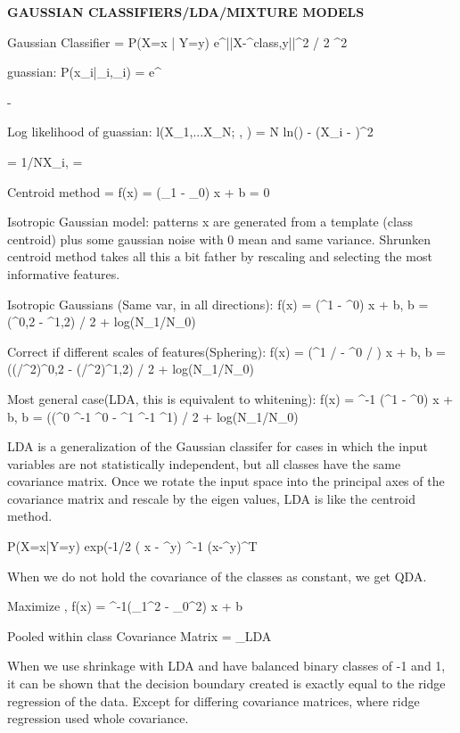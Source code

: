 \documentclass[a4paper,twoside,twocolumn]{article}
\begin{document}
\textbf{GAUSSIAN CLASSIFIERS/LDA/MIXTURE MODELS}

\setlength{\parindent}{0pt}
{\scriptsize

Gaussian Classifier = P(X=x | Y=y) \propto e^{||X-\mu^{class,y}||^2 / 2 \sigma^2}

guassian: P(x_i|\mu_i,\sigma_i) =  e^{- 

Log likelihood of guassian: l(X_1,...X_N; \mu, \sigma) = N ln() - \sum (X_i - \mu)^2

\mu = 1/N\sum X_i, \sigma = 

Centroid method = f(x) = (\mu_1 - \mu_0) \cdot x + b = 0

Isotropic Gaussian model: patterns x are generated from a template (class centroid) plus some gaussian noise with 0 mean and same variance. Shrunken centroid method takes all this a bit father by rescaling and selecting the most informative features.

Isotropic Gaussians (Same var, in all directions): f(x) = (\mu^1 - \mu^0) \cdot x + b, b = (\mu^{0,2} - \mu^{1,2}) / 2 + log(N_1/N_0)

Correct if different scales of features(Sphering): f(x) = (\mu^1 / \sigma - \mu^0 / \sigma) \cdot x + b, b = ((\mu/\sigma^2)^{0,2} -
(\mu/\sigma^2)^{1,2}) / 2 + log(N_1/N_0)

Most general case(LDA, this is equivalent to whitening): f(x) = \Sigma^{-1} (\mu^1 - \mu^0) \cdot x + b, b = ((\mu^0 \Sigma^{-1} \mu^0 - \mu^1 \Sigma^{-1} \mu^1) / 2 + log(N_1/N_0)

LDA is a generalization of the Gaussian classifer for cases in which the input variables are not statistically independent, but all classes have the same covariance matrix. Once we rotate the input space into the principal axes of the covariance matrix and rescale by the eigen values, LDA is like the centroid method.

P(X=x|Y=y) \propto exp(-1/2 ( x - \mu^y) \Sigma^-1 (x-\mu^y)^T

When we do not hold the covariance of the classes as constant, we get QDA.

Maximize ,  f(x) = \Sigma^{-1}(\mu_1^2 - \mu_0^2) \cdot x + b

Pooled within class Covariance Matrix = \Sigma_{LDA}

When we use shrinkage with LDA and have balanced binary classes of -1 and 1, it can be shown that the decision boundary created is exactly equal to the ridge regression of the data. Except for differing covariance matrices, where ridge regression used whole covariance.

}}
\end{document}
